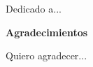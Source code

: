 \documentclass[11pt,oneside,letterpaper,leqno]{report}
\begin{document}
\begin{flushright}
Dedicado a...
\end{flushright}

\newpage

\vspace{13cm}

\huge
\textbf{Agradecimientos}

\normalsize
Quiero agradecer...

\newpage
\setcounter{page}{1}
\tableofcontents

\newpage
\listoffigures

\newpage
\listoftables





\newpage
{}




\newpage
\setcounter{page}{1}

\end{document}
